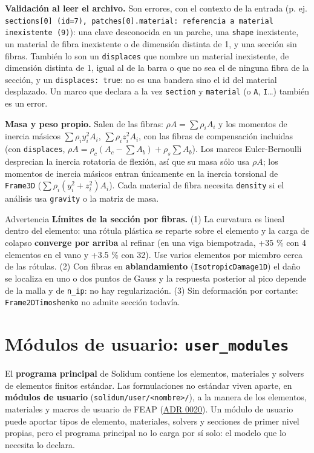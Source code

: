 \documentclass[11pt,oneside]{report}
\begin{document}
\textbf{Validación al leer el archivo.} Son errores, con el contexto de la entrada (p. ej. \texttt{sections[0] (id=7), patches[0].\allowbreak{}material: referencia a material inexistente (9)}): una clave desconocida en un parche, una \texttt{shape} inexistente, un material de fibra inexistente o de dimensión distinta de 1, y una sección sin fibras. También lo son un \texttt{displaces} que nombre un material inexistente, de dimensión distinta de 1, igual al de la barra o que no sea el de ninguna fibra de la sección, y un \texttt{displaces: true}: no es una bandera sino el id del material desplazado. Un marco que declara a la vez \texttt{section} y \texttt{material} (o \texttt{A}, \texttt{I}\ldots{}) también es un error.

\textbf{Masa y peso propio.} Salen de las fibras: $\rho A = \sum \rho_i A_i$ y los momentos de inercia másicos $\sum \rho_i y_i^2 A_i$, $\sum \rho_i z_i^2 A_i$, con las fibras de compensación incluidas (con \texttt{displaces}, $\rho A = \rho_c (A_c - \sum A_b) + \rho_s \sum A_b$). Los marcos Euler-Bernoulli desprecian la inercia rotatoria de flexión, así que su masa sólo usa $\rho A$; los momentos de inercia másicos entran únicamente en la inercia torsional de \texttt{Frame3D} ($\sum \rho_i (y_i^2 + z_i^2) A_i$). Cada material de fibra necesita \texttt{density} si el análisis usa \texttt{gravity} o la matriz de masa.

\begin{warnbox}{Advertencia}
\textbf{Límites de la sección por fibras.} (1) La curvatura es lineal dentro del elemento: una rótula plástica se reparte sobre el elemento y la carga de colapso \textbf{converge por arriba} al refinar (en una viga biempotrada, +35 \% con 4 elementos en el vano y +3.5 \% con 32). Use varios elementos por miembro cerca de las rótulas. (2) Con fibras en \textbf{ablandamiento} (\texttt{IsotropicDamage1D}) el daño se localiza en uno o dos puntos de Gauss y la respuesta posterior al pico depende de la malla y de \texttt{n\_ip}: no hay regularización. (3) Sin deformación por cortante: \texttt{Frame2DTimoshenko} no admite sección todavía.
\end{warnbox}

\section{Módulos de usuario: \texttt{user\_modules}}

El \textbf{programa principal} de Solidum contiene los elementos, materiales y solvers de elementos finitos estándar. Las formulaciones no estándar viven aparte, en \textbf{módulos de usuario} (\texttt{solidum/\allowbreak{}user/\allowbreak{}\textless{}nombre\textgreater{}/\allowbreak{}}), a la manera de los elementos, materiales y macros de usuario de FEAP (\href{https://github.com/jretamav/solidum-fem/blob/main/docs/adr/0020-modulos-de-usuario.md}{ADR 0020}). Un módulo de usuario puede aportar tipos de elemento, materiales, solvers y secciones de primer nivel propias, pero el programa principal no lo carga por sí solo: el modelo que lo necesita lo declara.
\end{document}
